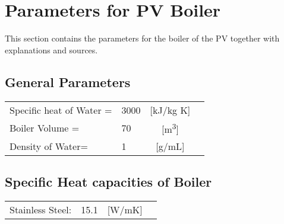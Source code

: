 \section{Parameters for PV Boiler}

This section contains the parameters for the boiler of the PV together with explanations and sources.
\subsection{General Parameters}
\begin{tabular}{ l l |c| l}
	Specific heat of Water = &3000 & [kJ/kg K]\\
	Boiler Volume = &70 & [m\textsuperscript{3}]\\
	Density of Water= &1 & [g/mL]\\
\end{tabular}

\subsection{Specific Heat capacities of Boiler}
\begin{tabular}{ l l |c| l}
	Stainless Steel: &15.1 & [W/mK] 
\end{tabular}